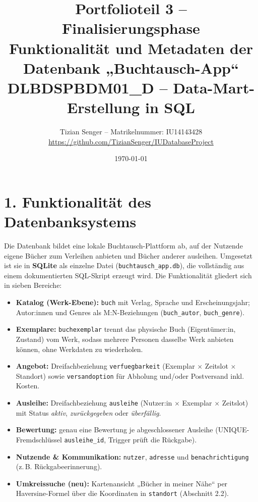 \documentclass[11pt,a4paper]{article}
\title{\vspace{-1.6cm}\Large\textbf{Portfolioteil 3 -- Finalisierungsphase}\\[2pt]
\large Funktionalität und Metadaten der Datenbank „Buchtausch-App“\\[2pt]
\normalsize DLBDSPBDM01\_D -- Data-Mart-Erstellung in SQL}
\author{Tizian Senger -- Matrikelnummer: IU14143428\\
\url{https://github.com/TizianSenger/IUDatabaseProject}}
\date{\vspace{-4pt}\today}
\begin{document}
\maketitle
\vspace{-1.1cm}

\section*{1. Funktionalität des Datenbanksystems}
Die Datenbank bildet eine lokale Buchtausch-Plattform ab, auf der Nutzende eigene Bücher zum Verleihen anbieten und Bücher anderer ausleihen. Umgesetzt ist sie in \textbf{SQLite \mdSQLite} als einzelne Datei (\texttt{buchtausch\_app.db}), die vollständig aus einem dokumentierten SQL-Skript erzeugt wird. Die Funktionalität gliedert sich in sieben Bereiche:
\begin{itemize}
  \item \textbf{Katalog (Werk-Ebene):} \texttt{buch} mit Verlag, Sprache und Erscheinungsjahr; Autor:innen und Genres als M:N-Beziehungen (\texttt{buch\_autor}, \texttt{buch\_genre}).
  \item \textbf{Exemplare:} \texttt{buchexemplar} trennt das physische Buch (Eigentümer:in, Zustand) vom Werk, sodass mehrere Personen dasselbe Werk anbieten können, ohne Werkdaten zu wiederholen.
  \item \textbf{Angebot:} Dreifachbeziehung \texttt{verfuegbarkeit} (Exemplar $\times$ Zeitslot $\times$ Standort) sowie \texttt{versandoption} für Abholung und/oder Postversand inkl. Kosten.
  \item \textbf{Ausleihe:} Dreifachbeziehung \texttt{ausleihe} (Nutzer:in $\times$ Exemplar $\times$ Zeitslot) mit Status \emph{aktiv}, \emph{zurückgegeben} oder \emph{überfällig}.
  \item \textbf{Bewertung:} genau eine Bewertung je abgeschlossener Ausleihe (UNIQUE-Fremdschlüssel \texttt{ausleihe\_id}, Trigger prüft die Rückgabe).
  \item \textbf{Nutzende \& Kommunikation:} \texttt{nutzer}, \texttt{adresse} und \texttt{benachrichtigung} (z.\,B. Rückgabeerinnerung).
  \item \textbf{Umkreissuche (neu):} Kartenansicht „Bücher in meiner Nähe“ per Haversine-Formel über die Koordinaten in \texttt{standort} (Abschnitt 2.2).
\end{itemize}
\end{document}
